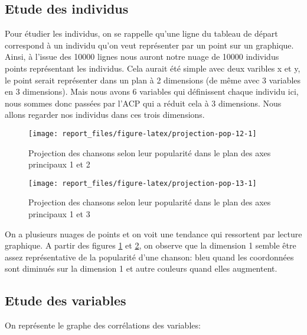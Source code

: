 \documentclass[
  11pt,
  xcolor = usenames,dvipsnames]{article}
\begin{document}
\hypertarget{etude-des-individus}{%
\subsection{Etude des individus}\label{etude-des-individus}}

Pour étudier les individus, on se rappelle qu'une ligne du tableau de départ correspond à un individu qu'on veut représenter par un point sur un graphique.
Ainsi, à l'issue des 10000 lignes nous auront notre nuage de 10000 individus points représentant les individus. Cela aurait été simple avec deux varibles x et y, le point serait représenter dans un plan à 2 dimensions (de même avec 3 variables en 3 dimensions).
Mais nous avons 6 variables qui définissent chaque individu ici, nous sommes donc passées par l'ACP qui a réduit cela à 3 dimensions. Nous
allons regarder nos individus dans ces trois dimensions.

\begin{figure}

{\centering \texttt{[image: report\_files/figure-latex/projection-pop-12-1]} 

}

\caption{Projection des chansons selon leur popularité dans le plan des axes principaux 1 et 2}\label{fig:projection-pop-12}
\end{figure}
\begin{figure}

{\centering \texttt{[image: report\_files/figure-latex/projection-pop-13-1]} 

}

\caption{Projection des chansons selon leur popularité dans le plan des axes principaux 1 et 3}\label{fig:projection-pop-13}
\end{figure}

On a plusieurs nuages de points et on voit une tendance qui ressortent par lecture graphique. A partir des figures
\ref{fig:projection-pop-12} et \ref{fig:projection-pop-13}, on observe que la dimension 1 semble être assez représentative de la popularité d'une chanson:
bleu quand les coordonnées sont diminués sur la dimension 1 et autre couleurs quand elles augmentent.

\hypertarget{etude-des-variables}{%
\subsection{Etude des variables}\label{etude-des-variables}}

On représente le graphe des corrélations des variables:
\end{document}
